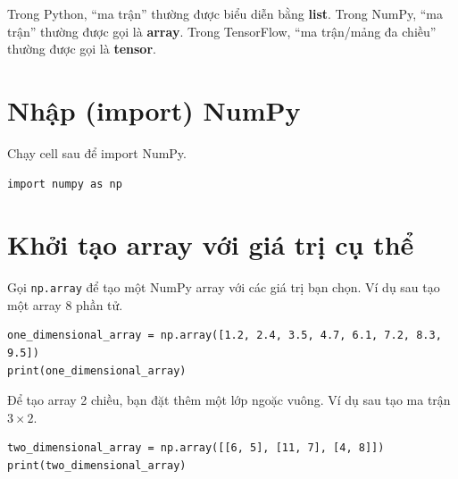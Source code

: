 \documentclass[12pt,a4paper]{article}
\begin{document}
\begin{ynghia}[title={Cách gọi ``ma trận'' trong các thư viện}]
Trong Python, ``ma trận'' thường được biểu diễn bằng \textbf{list}.
Trong NumPy, ``ma trận'' thường được gọi là \textbf{array}.
Trong TensorFlow, ``ma trận/mảng đa chiều'' thường được gọi là \textbf{tensor}.
\end{ynghia}

\section{Nhập (import) NumPy}

\begin{phuongphap}[title={Import module NumPy}]
Chạy cell sau để import NumPy.
\end{phuongphap}

\begin{lstlisting}
import numpy as np
\end{lstlisting}

\section{Khởi tạo array với giá trị cụ thể}

\begin{phuongphap}[title={Tạo array 1 chiều bằng \texttt{np.array}}]
Gọi \texttt{np.array} để tạo một NumPy array với các giá trị bạn chọn.
Ví dụ sau tạo một array 8 phần tử.
\end{phuongphap}

\begin{lstlisting}
one_dimensional_array = np.array([1.2, 2.4, 3.5, 4.7, 6.1, 7.2, 8.3, 9.5])
print(one_dimensional_array)
\end{lstlisting}

\begin{phuongphap}[title={Tạo array 2 chiều (ma trận)}]
Để tạo array 2 chiều, bạn đặt thêm một lớp ngoặc vuông. Ví dụ sau tạo ma trận $3 \times 2$.
\end{phuongphap}

\begin{lstlisting}
two_dimensional_array = np.array([[6, 5], [11, 7], [4, 8]])
print(two_dimensional_array)
\end{lstlisting}
\end{document}
